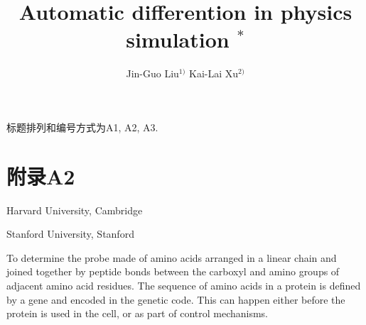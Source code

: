 \documentclass[A4,twoside,fontset=ubuntu,UTF8]{ctexart}
\begin{document}
标题排列和编号方式为A1, A2, A3.

\section*{附录A2}
%
%
%
%
%

\bigskip




\newpage

\title{Automatic differention in physics simulation $^{\ast}$}%




\author{Jin-Guo Liu$^{1)}$ \quad Kai-Lai Xu$^{2)}$}

\address{1)}{Harvard University, Cambridge }
\address{2)}{Stanford University, Stanford }




\eabstract{}

\small  To determine the probe made of amino acids arranged in a linear chain and joined together by peptide bonds between the carboxyl and amino groups of adjacent amino acid residues. The sequence of amino acids in a protein is defined by a gene and encoded in the genetic code. This can happen either
before the protein is used in the cell, or as part of control mechanisms.


\end{document}
